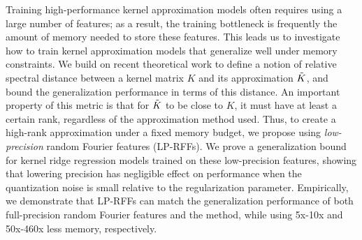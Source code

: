 
Training high-performance kernel approximation models often requires using a large number of features; as a result, the training bottleneck is frequently the amount of memory needed to store these features. This leads us to investigate how to train kernel approximation models that generalize well under memory constraints. We build on recent theoretical work to define a notion of relative spectral distance between a kernel matrix $K$ and its approximation $\tilde{K}$, and bound the generalization performance in terms of this distance. An important property of this metric is that for $\tilde{K}$ to be close to $K$, it must have at least a certain rank, regardless of the approximation method used. Thus, to create a high-rank approximation under a fixed memory budget, we propose using \emph{low-precision} random Fourier features (LP-RFFs). We prove a generalization bound for kernel ridge regression models trained on these low-precision features, showing that lowering precision has negligible effect on performance when the quantization noise is small relative to the regularization parameter. Empirically, we demonstrate that LP-RFFs can match the generalization performance of both full-precision random Fourier features and the \Nystrom method, while using 5x-10x and 50x-460x less memory, respectively.



